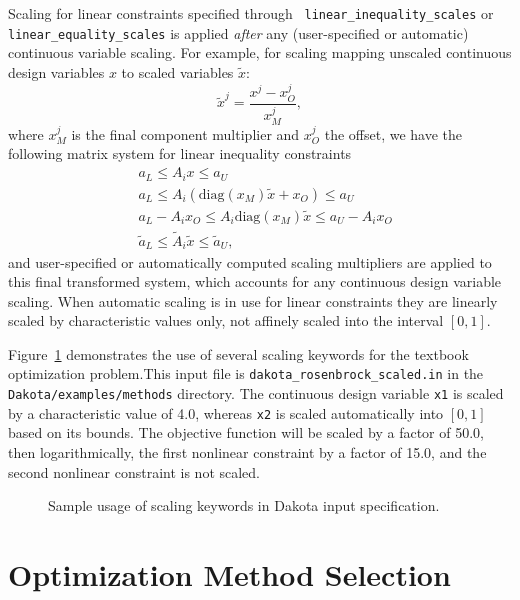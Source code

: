 Scaling for linear constraints specified through {\tt
linear\_inequality\_scales} or {\tt linear\_equality\_scales} is
applied {\em after} any (user-specified or automatic) continuous
variable scaling.  For example, for scaling mapping unscaled
continuous design variables $x$ to scaled variables $\tilde{x}$:
\[ \tilde{x}^j = \frac{x^j - x^j_O}{x^j_M}, \]
where $x^j_M$ is the final component multiplier and $x^j_O$ the
offset, we have the following matrix system for linear inequality
constraints
\begin{eqnarray*}
& a_L \leq A_i x \leq a_U \\
& a_L \leq A_i \left( \mathrm{diag}(x_M) \tilde{x} + x_O \right) \leq a_U \\
& a_L - A_i x_O \leq A_i \mathrm{diag}(x_M) \tilde{x} \leq a_U - A_i x_O \\
& \tilde{a}_L \leq \tilde{A}_i \tilde{x} \leq \tilde{a}_U,
\end{eqnarray*}
and user-specified or automatically computed scaling multipliers are
applied to this final transformed system, which accounts for any
continuous design variable scaling.  When automatic scaling is in use
for linear constraints they are linearly scaled by characteristic
values only, not affinely scaled into the interval $[0,1]$.

Figure~\ref{opt:additional:scaling:figure01} demonstrates the use of
several scaling keywords for the textbook optimization problem.This input file is \texttt{dakota\_rosenbrock\_scaled.in} 
in the \texttt{Dakota/examples/methods} directory.  The
continuous design variable {\tt x1} is scaled by a characteristic
value of 4.0, whereas {\tt x2} is scaled automatically into $[0,1]$
based on its bounds.  The objective function will be scaled by a
factor of 50.0, then logarithmically, the first nonlinear constraint
by a factor of 15.0, and the second nonlinear constraint is not
scaled.

\begin{figure}
\centering
\begin{bigbox}
\begin{small}
\end{small}
\end{bigbox}
\caption{Sample usage of scaling keywords in Dakota input specification.}
\label{opt:additional:scaling:figure01}
\end{figure}


\section{Optimization Method Selection}\label{opt:usage}

